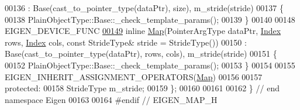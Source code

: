 \begin{DoxyCode}
00136       : Base(cast\_to\_pointer\_type(dataPtr), size), m\_stride(stride)
00137     \{
00138       PlainObjectType::Base::\_check\_template\_params();
00139     \}
00140 
00148     EIGEN\_DEVICE\_FUNC
\hyperlink{group___core___module_a8d94447f7900113cab8e7fd520800d39}{00149}     \textcolor{keyword}{inline} \hyperlink{group___core___module_a8d94447f7900113cab8e7fd520800d39}{Map}(PointerArgType dataPtr, \hyperlink{namespace_eigen_a62e77e0933482dafde8fe197d9a2cfde}{Index} rows, \hyperlink{namespace_eigen_a62e77e0933482dafde8fe197d9a2cfde}{Index} cols, \textcolor{keyword}{const} StrideType& stride = 
      StrideType())
00150       : Base(cast\_to\_pointer\_type(dataPtr), rows, cols), m\_stride(stride)
00151     \{
00152       PlainObjectType::Base::\_check\_template\_params();
00153     \}
00154 
00155     EIGEN\_INHERIT\_ASSIGNMENT\_OPERATORS(\hyperlink{group___core___module_class_eigen_1_1_map}{Map})
00156 
00157   \textcolor{keyword}{protected}:
00158     StrideType m\_stride;
00159 \};
00160 
00161 
00162 \} \textcolor{comment}{// end namespace Eigen}
00163 
00164 \textcolor{preprocessor}{#endif // EIGEN\_MAP\_H}
\end{DoxyCode}

